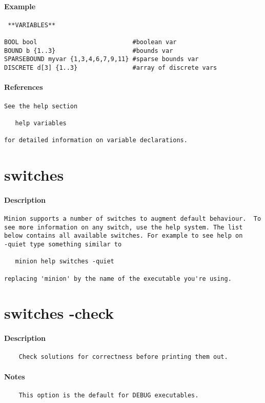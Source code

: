 \paragraph{Example}
{\footnotesize
\begin{verbatim}
 **VARIABLES**

BOOL bool                          #boolean var
BOUND b {1..3}                     #bounds var
SPARSEBOUND myvar {1,3,4,6,7,9,11} #sparse bounds var
DISCRETE d[3] {1..3}               #array of discrete vars
\end{verbatim}
}
\paragraph{References}
{\footnotesize
\begin{verbatim}
See the help section

   help variables

for detailed information on variable declarations.
\end{verbatim}
}
\section{switches}
\paragraph{Description}
{\footnotesize
\begin{verbatim}
Minion supports a number of switches to augment default behaviour.  To
see more information on any switch, use the help system. The list
below contains all available switches. For example to see help on
-quiet type something similar to

   minion help switches -quiet

replacing 'minion' by the name of the executable you're using.
\end{verbatim}
}
\section{switches -check}
\paragraph{Description}
{\footnotesize
\begin{verbatim}
    Check solutions for correctness before printing them out.
\end{verbatim}
}
\paragraph{Notes}
{\footnotesize
\begin{verbatim}
    This option is the default for DEBUG executables.
\end{verbatim}
}
